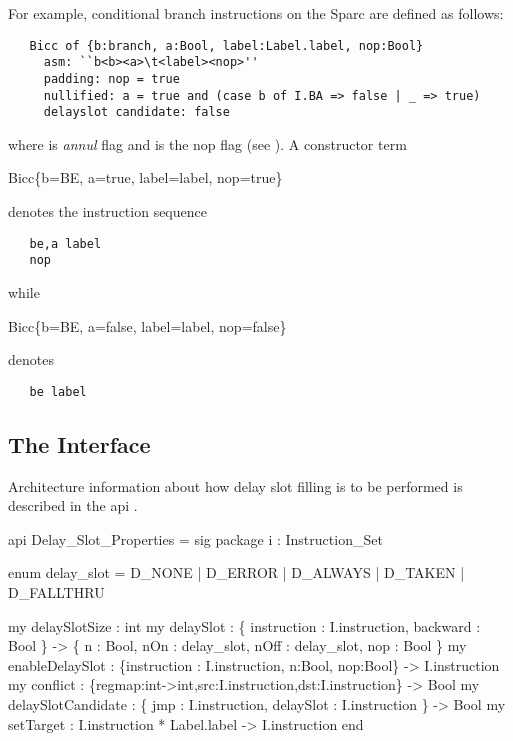 For example, conditional branch instructions on the Sparc are defined 
as follows:
\begin{verbatim}
   Bicc of {b:branch, a:Bool, label:Label.label, nop:Bool}
     asm: ``b<b><a>\t<label><nop>''
     padding: nop = true
     nullified: a = true and (case b of I.BA => false | _ => true)
     delayslot candidate: false
\end{verbatim}
\noindent where  is \emph{annul} flag and  is the nop 
flag (see ).
A constructor term
\begin{SML}
   Bicc\{b=BE, a=true, label=label, nop=true\}
\end{SML}
denotes the instruction sequence
\begin{verbatim}
   be,a label
   nop
\end{verbatim}
while
\begin{SML}
   Bicc\{b=BE, a=false, label=label, nop=false\}
\end{SML}
denotes 
\begin{verbatim}
   be label
\end{verbatim}


\subsection{The Interface}

Architecture information about how delay slot filling is to be performed
is described in the api
.
\begin{SML}
api Delay_Slot_Properties =
sig
   package i : Instruction_Set

   enum delay_slot = 
     D_NONE   | D_ERROR   | D_ALWAYS  
   | D_TAKEN  | D_FALLTHRU 

   my delaySlotSize : int 
   my delaySlot : \{ instruction : I.instruction, backward : Bool \} -> 
		   \{ n    : Bool,      
		     nOn  : delay_slot,
		     nOff : delay_slot,
		     nop  : Bool      
		   \} 
   my enableDelaySlot : 
	 \{instruction : I.instruction, n:Bool, nop:Bool\} -> I.instruction
   my conflict : 
         \{regmap:int->int,src:I.instruction,dst:I.instruction\} -> Bool
   my delaySlotCandidate : 
         \{ jmp : I.instruction, delaySlot : I.instruction \} -> Bool
   my setTarget : I.instruction * Label.label -> I.instruction
end
\end{SML}

